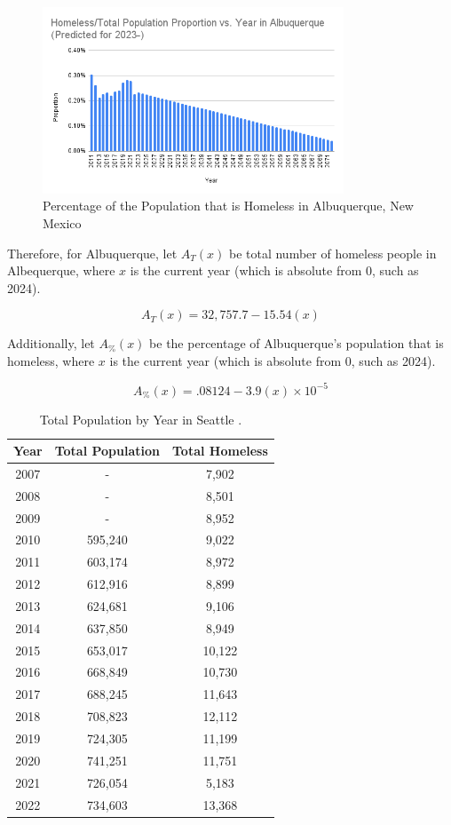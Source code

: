 \documentclass[12pt]{article}
\begin{document}
\begin{figure}[H]
  \centering
  \includegraphics[width=0.8\textwidth]{homeless-prop-vs-year-alb}
  \caption{Percentage of the Population that is Homeless in Albuquerque, New Mexico}
\end{figure}

\noindent
Therefore, for Albuquerque, let $A_{T}(x)$ be total number of homeless people in Albequerque, where $x$ is the current year (which is absolute from 0, such as 2024).

$$A_{T}(x) = 32,757.7 - 15.54(x)$$

\noindent
Additionally, let $A_{\%}(x)$ be the percentage of Albuquerque's population that is homeless, where $x$ is the current year (which is absolute from 0, such as 2024).

$$A_{\%}(x) = .08124 - 3.9(x) \times 10^{-5}$$

\begin{table}[H]
  \centering
  \begin{tabular}{|c c c|} 
    \hline 
    Year & Total Population & Total Homeless \\ [0.5ex]
    \hline
    2007 & -       & 7,902 \\
    2008 & -       & 8,501 \\
    2009 & -       & 8,952 \\
    2010 & 595,240 & 9,022 \\
    2011 & 603,174 & 8,972 \\
    2012 & 612,916 & 8,899 \\
    2013 & 624,681 & 9,106 \\
    2014 & 637,850 & 8,949 \\
    2015 & 653,017 & 10,122 \\
    2016 & 668,849 & 10,730 \\
    2017 & 688,245 & 11,643 \\
    2018 & 708,823 & 12,112 \\
    2019 & 724,305 & 11,199 \\
    2020 & 741,251 & 11,751 \\
    2021 & 726,054 & 5,183 \\
    2022 & 734,603 & 13,368 \\
    \hline
  \end{tabular}
  \caption{Total Population by Year in Seattle \cite{Census2022ACSST1Y2022.S0101,HOMELESS-STATS}.}
\end{table}
\end{document}
